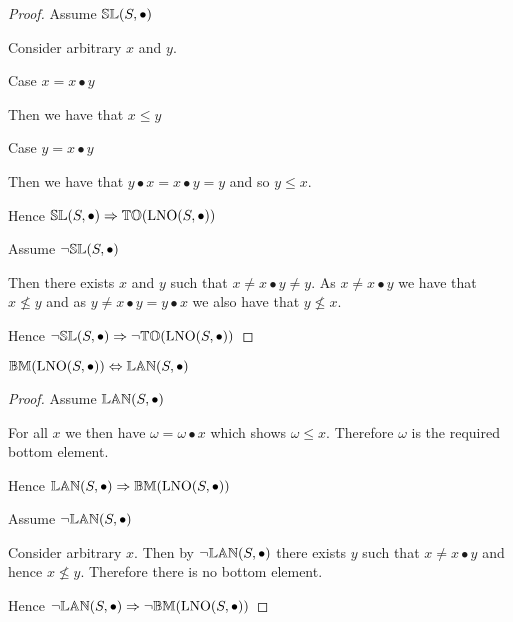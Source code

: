 \begin{proof}

\vspace{0.5em}

Assume ${\mathbb{SL}}(S,\bullet)$
\begin{ind}
Consider arbitrary $x$ and $y$.
\begin{ind}
Case $x = x \bullet y$
\begin{ind}
Then we have that $x \leq y$
\end{ind}

Case $y = x \bullet y$
\begin{ind}
Then we have that $y \bullet x = x \bullet y = y$ and so $y \leq x$.
\end{ind}
\end{ind}
\end{ind}
Hence ${\mathbb{SL}}(S,\bullet) \Rightarrow {\mathbb{TO}}(\mathrm{LNO}(S,\bullet))$

\vspace{2em}

Assume $\neg {\mathbb{SL}}(S,\bullet)$
\begin{ind}
Then there exists $x$ and $y$ such that $x \neq x \bullet y \neq y$. As $x \neq x \bullet y$ we have that $x \nleq y$ and as $y \neq x \bullet y = y \bullet x$ we also have that $y \nleq x$.
\end{ind}
Hence $\neg {\mathbb{SL}}(S,\bullet) \Rightarrow \neg {\mathbb{TO}}(\mathrm{LNO}(S,\bullet))$
\end{proof}





\begin{theorem} \label{thm:lno_bottom}
${\mathbb{BM}}(\mathrm{LNO}(S,\bullet)) \Leftrightarrow {\mathbb{LAN}}(S, \bullet)$
\end{theorem}

\begin{proof}

\vspace{0.5em}

Assume ${\mathbb{LAN}}(S,\bullet)$
\begin{ind}
For all $x$ we then have $\omega = \omega \bullet x$ which shows $\omega \leq x$. Therefore $\omega$ is the required bottom element.
\end{ind}
Hence ${\mathbb{LAN}}(S,\bullet) \Rightarrow {\mathbb{BM}}(\mathrm{LNO}(S,\bullet))$

\vspace{2em}

Assume $\neg {\mathbb{LAN}}(S,\bullet)$
\begin{ind}
Consider arbitrary $x$. Then by $\neg {\mathbb{LAN}}(S,\bullet)$ there exists $y$ such that $x \neq x \bullet y$ and hence $x \nleq y$. Therefore there is no bottom element.
\end{ind}
Hence $\neg {\mathbb{LAN}}(S,\bullet) \Rightarrow \neg {\mathbb{BM}}(\mathrm{LNO}(S,\bullet))$
\end{proof}





